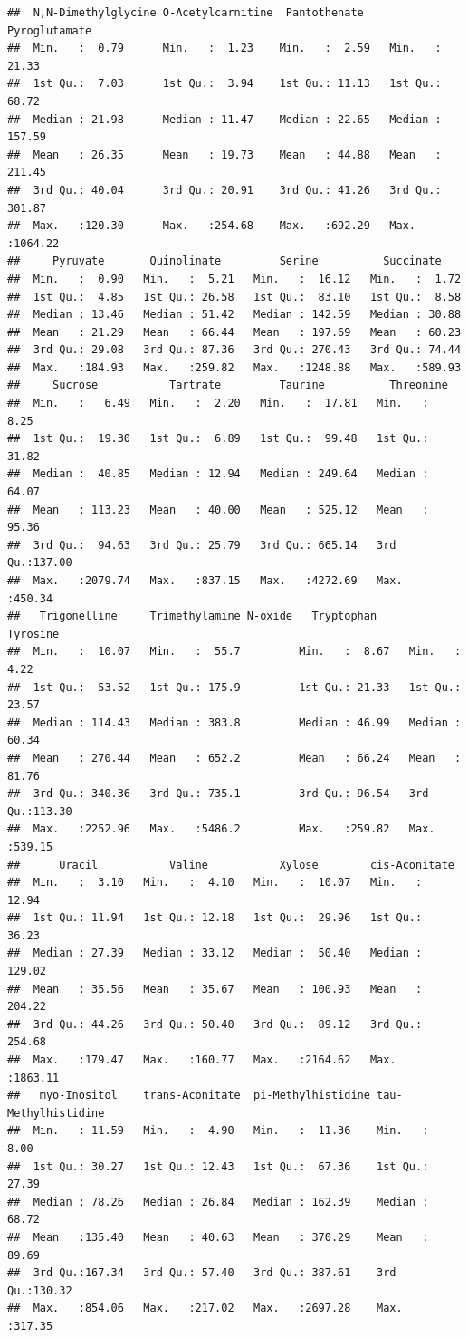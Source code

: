\documentclass[
]{article}
\begin{document}
\begin{verbatim}
##  N,N-Dimethylglycine O-Acetylcarnitine  Pantothenate    Pyroglutamate    
##  Min.   :  0.79      Min.   :  1.23    Min.   :  2.59   Min.   :  21.33  
##  1st Qu.:  7.03      1st Qu.:  3.94    1st Qu.: 11.13   1st Qu.:  68.72  
##  Median : 21.98      Median : 11.47    Median : 22.65   Median : 157.59  
##  Mean   : 26.35      Mean   : 19.73    Mean   : 44.88   Mean   : 211.45  
##  3rd Qu.: 40.04      3rd Qu.: 20.91    3rd Qu.: 41.26   3rd Qu.: 301.87  
##  Max.   :120.30      Max.   :254.68    Max.   :692.29   Max.   :1064.22  
##     Pyruvate       Quinolinate         Serine          Succinate     
##  Min.   :  0.90   Min.   :  5.21   Min.   :  16.12   Min.   :  1.72  
##  1st Qu.:  4.85   1st Qu.: 26.58   1st Qu.:  83.10   1st Qu.:  8.58  
##  Median : 13.46   Median : 51.42   Median : 142.59   Median : 30.88  
##  Mean   : 21.29   Mean   : 66.44   Mean   : 197.69   Mean   : 60.23  
##  3rd Qu.: 29.08   3rd Qu.: 87.36   3rd Qu.: 270.43   3rd Qu.: 74.44  
##  Max.   :184.93   Max.   :259.82   Max.   :1248.88   Max.   :589.93  
##     Sucrose           Tartrate         Taurine          Threonine     
##  Min.   :   6.49   Min.   :  2.20   Min.   :  17.81   Min.   :  8.25  
##  1st Qu.:  19.30   1st Qu.:  6.89   1st Qu.:  99.48   1st Qu.: 31.82  
##  Median :  40.85   Median : 12.94   Median : 249.64   Median : 64.07  
##  Mean   : 113.23   Mean   : 40.00   Mean   : 525.12   Mean   : 95.36  
##  3rd Qu.:  94.63   3rd Qu.: 25.79   3rd Qu.: 665.14   3rd Qu.:137.00  
##  Max.   :2079.74   Max.   :837.15   Max.   :4272.69   Max.   :450.34  
##   Trigonelline     Trimethylamine N-oxide   Tryptophan        Tyrosine     
##  Min.   :  10.07   Min.   :  55.7         Min.   :  8.67   Min.   :  4.22  
##  1st Qu.:  53.52   1st Qu.: 175.9         1st Qu.: 21.33   1st Qu.: 23.57  
##  Median : 114.43   Median : 383.8         Median : 46.99   Median : 60.34  
##  Mean   : 270.44   Mean   : 652.2         Mean   : 66.24   Mean   : 81.76  
##  3rd Qu.: 340.36   3rd Qu.: 735.1         3rd Qu.: 96.54   3rd Qu.:113.30  
##  Max.   :2252.96   Max.   :5486.2         Max.   :259.82   Max.   :539.15  
##      Uracil           Valine           Xylose        cis-Aconitate    
##  Min.   :  3.10   Min.   :  4.10   Min.   :  10.07   Min.   :  12.94  
##  1st Qu.: 11.94   1st Qu.: 12.18   1st Qu.:  29.96   1st Qu.:  36.23  
##  Median : 27.39   Median : 33.12   Median :  50.40   Median : 129.02  
##  Mean   : 35.56   Mean   : 35.67   Mean   : 100.93   Mean   : 204.22  
##  3rd Qu.: 44.26   3rd Qu.: 50.40   3rd Qu.:  89.12   3rd Qu.: 254.68  
##  Max.   :179.47   Max.   :160.77   Max.   :2164.62   Max.   :1863.11  
##   myo-Inositol    trans-Aconitate  pi-Methylhistidine tau-Methylhistidine
##  Min.   : 11.59   Min.   :  4.90   Min.   :  11.36    Min.   :  8.00     
##  1st Qu.: 30.27   1st Qu.: 12.43   1st Qu.:  67.36    1st Qu.: 27.39     
##  Median : 78.26   Median : 26.84   Median : 162.39    Median : 68.72     
##  Mean   :135.40   Mean   : 40.63   Mean   : 370.29    Mean   : 89.69     
##  3rd Qu.:167.34   3rd Qu.: 57.40   3rd Qu.: 387.61    3rd Qu.:130.32     
##  Max.   :854.06   Max.   :217.02   Max.   :2697.28    Max.   :317.35
\end{verbatim}
\end{document}
